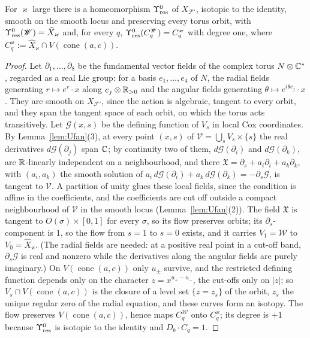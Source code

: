 \begin{lemma}\label{lem:T0}
For $\varkappa$ large there is a homeomorphism $\Upsilon^0_{\rm res}$ of $X_{\mathcal F'}$, isotopic to the identity, smooth on the smooth locus
and preserving every torus orbit, with $\Upsilon^0_{\rm res}(\mathscr W)=\widehat X_\varkappa$ and, for every $q$,
$\Upsilon^0_{\rm res}(C^{\mathscr W}_q)=C_q^\varkappa$ with degree one, where $C_q^\varkappa:=\widehat X_\varkappa\cap V(\operatorname{cone}(a,c))$.
\end{lemma}
\begin{proof}
Let $\partial_1,\dots,\partial_8$ be the fundamental vector fields of the complex torus $N\otimes\mathbb C^*$, regarded as a real Lie
group: for a basis $e_1,\dots,e_4$ of $N$, the radial fields generating $r\mapsto e^{r}\cdot x$ along $e_j\otimes\mathbb R_{>0}$ and the
angular fields generating $\theta\mapsto e^{i\theta e_j}\cdot x$. They are smooth on $X_{\mathcal F'}$, since the action is
algebraic, tangent to every orbit, and they span the tangent space of each orbit, on which the torus acts transitively. Let
$\mathcal G(x,s)$ be the defining function of $V_s$ in local Cox coordinates. By Lemma~\ref{lem:Ufan}(3), at every point $(x,s)$
of $\mathcal V=\bigcup_sV_s\times\{s\}$ the real derivatives $d\mathcal G(\partial_j)$ span $\mathbb C$; by continuity two of them,
$d\mathcal G(\partial_i)$ and $d\mathcal G(\partial_k)$, are $\mathbb R$-linearly independent on a neighbourhood, and there
$\mathfrak X=\partial_s+a_i\partial_i+a_k\partial_k$, with $(a_i,a_k)$ the smooth solution of
$a_i\,d\mathcal G(\partial_i)+a_k\,d\mathcal G(\partial_k)=-\partial_s\mathcal G$, is tangent to $\mathcal V$. A partition of
unity glues these local fields, since the condition is affine in the coefficients, and the coefficients are cut off outside a
compact neighbourhood of $\mathcal V$ in the smooth locus (Lemma~\ref{lem:Ufan}(2)). The field $\mathfrak X$ is tangent to
$O(\sigma)\times[0,1]$ for every $\sigma$, so its flow preserves orbits; its $\partial_s$-component is $1$, so the flow from $s=1$
to $s=0$ exists, and it carries $V_1=\mathscr W$ to $V_0=\widehat X_\varkappa$. (The radial fields are needed: at a positive real point in a
cut-off band, $\partial_s\mathcal G$ is real and nonzero while the derivatives along the angular fields are purely imaginary.) On
$V(\operatorname{cone}(a,c))$ only $u_\pm$ survive, and the restricted defining function depends only on the character
$z=x^{u_+-u_-}$, the cut-offs only on $|z|$; so $V_s\cap V(\operatorname{cone}(a,c))$ is the closure of a level set $\{z=z_s\}$
of the orbit, $z_s$ the unique regular zero of the radial equation, and these curves form an isotopy. The flow preserves
$V(\operatorname{cone}(a,c))$, hence maps $C^{\mathscr W}_q$ onto $C^\varkappa_q$; its degree is $+1$ because $\Upsilon^0_{\rm res}$ is isotopic to the
identity and $D_b\cdot C_q=1$.
\end{proof}


